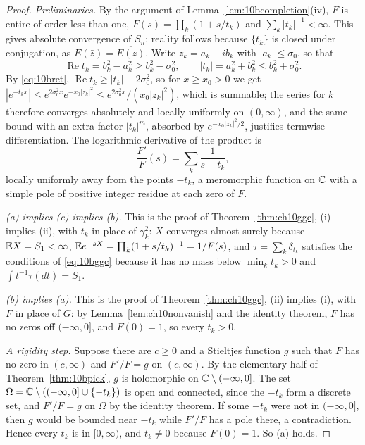 \begin{proof}
\emph{Preliminaries.} By the argument of Lemma~\ref{lem:10bcompletion}(iv), $F$ is entire of order less than one, $F(s) = \prod_k(1+s/t_k)$ and $\sum_k|t_k|^{-1}<\infty$. This gives absolute convergence of $S_n$; reality follows because $\{t_k\}$ is closed under conjugation, as $E(\bar z) = \overline{E(z)}$. Write $z_k = a_k+ib_k$ with $|a_k|\le\sigma_0$, so that
\begin{equation}\label{eq:10bret}
\operatorname{Re}t_k = b_k^2-a_k^2\ge b_k^2-\sigma_0^2,\qquad|t_k| = a_k^2+b_k^2\le b_k^2+\sigma_0^2 .
\end{equation}
By \eqref{eq:10bret}, $\operatorname{Re}t_k\ge|t_k|-2\sigma_0^2$, so for $x\ge x_0>0$ we get $|e^{-t_kx}|\le e^{2\sigma_0^2x}e^{-x_0|z_k|^2}\le e^{2\sigma_0^2x}/(x_0|z_k|^2)$, which is summable; the series for $k$ therefore converges absolutely and locally uniformly on $(0,\infty)$, and the same bound with an extra factor $|t_k|^m$, absorbed by $e^{-x_0|z_k|^2/2}$, justifies termwise differentiation. The logarithmic derivative of the product is
\begin{equation}\label{eq:10blogder}
\frac{F'}{F}(s) = \sum_k\frac1{s+t_k},
\end{equation}
locally uniformly away from the points $-t_k$, a meromorphic function on $\mathbb{C}$ with a simple pole of positive integer residue at each zero of $F$.

\emph{(a) implies (c) implies (b).} This is the proof of Theorem~\ref{thm:ch10ggc}, (i) implies (ii), with $t_k$ in place of $\gamma_k^2$: $X$ converges almost surely because $\mathbb{E} X = S_1<\infty$, $\mathbb{E} e^{-sX} = \prod_k(1+s/t_k)^{-1} = 1/F(s)$, and $\tau = \sum_k\delta_{t_k}$ satisfies the conditions of \eqref{eq:10bggc} because it has no mass below $\min_kt_k>0$ and $\int t^{-1}\tau(dt) = S_1$.

\emph{(b) implies (a).} This is the proof of Theorem~\ref{thm:ch10ggc}, (ii) implies (i), with $F$ in place of $G$: by Lemma~\ref{lem:ch10nonvanish} and the identity theorem, $F$ has no zeros off $(-\infty,0]$, and $F(0)=1$, so every $t_k>0$.

\emph{A rigidity step.} Suppose there are $c\ge0$ and a Stieltjes function $g$ such that $F$ has no zero in $(c,\infty)$ and $F'/F = g$ on $(c,\infty)$. By the elementary half of Theorem~\ref{thm:10bpick}, $g$ is holomorphic on $\mathbb{C}\setminus(-\infty,0]$. The set $\Omega = \mathbb{C}\setminus((-\infty,0]\cup\{-t_k\})$ is open and connected, since the $-t_k$ form a discrete set, and $F'/F = g$ on $\Omega$ by the identity theorem. If some $-t_k$ were not in $(-\infty,0]$, then $g$ would be bounded near $-t_k$ while $F'/F$ has a pole there, a contradiction. Hence every $t_k$ is in $[0,\infty)$, and $t_k\ne0$ because $F(0)=1$. So (a) holds.


\end{proof}
